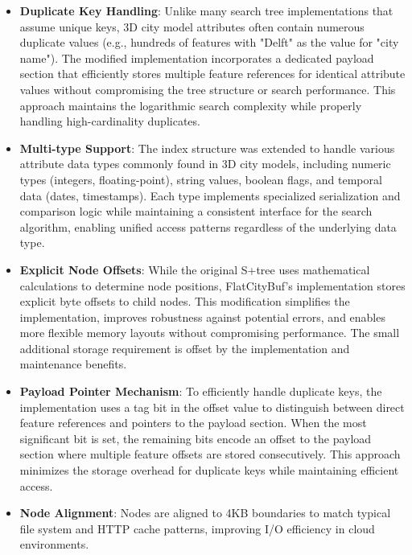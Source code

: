 \begin{itemize}
    \item \textbf{Duplicate Key Handling}: Unlike many search tree implementations that assume unique keys, 3D city model attributes often contain numerous duplicate values (e.g., hundreds of features with "Delft" as the value for "city name"). The modified implementation incorporates a dedicated payload section that efficiently stores multiple feature references for identical attribute values without compromising the tree structure or search performance. This approach maintains the logarithmic search complexity while properly handling high-cardinality duplicates.

    \item \textbf{Multi-type Support}: The index structure was extended to handle various attribute data types commonly found in 3D city models, including numeric types (integers, floating-point), string values, boolean flags, and temporal data (dates, timestamps). Each type implements specialized serialization and comparison logic while maintaining a consistent interface for the search algorithm, enabling unified access patterns regardless of the underlying data type.

    \item \textbf{Explicit Node Offsets}: While the original S+tree uses mathematical calculations to determine node positions, FlatCityBuf's implementation stores explicit byte offsets to child nodes. This modification simplifies the implementation, improves robustness against potential errors, and enables more flexible memory layouts without compromising performance. The small additional storage requirement is offset by the implementation and maintenance benefits.
    
    \item \textbf{Payload Pointer Mechanism}: To efficiently handle duplicate keys, the implementation uses a tag bit in the offset value to distinguish between direct feature references and pointers to the payload section. When the most significant bit is set, the remaining bits encode an offset to the payload section where multiple feature offsets are stored consecutively. This approach minimizes the storage overhead for duplicate keys while maintaining efficient access.
    
    \item \textbf{Node Alignment}: Nodes are aligned to 4KB boundaries to match typical file system and HTTP cache patterns, improving I/O efficiency in cloud environments.
\end{itemize}

